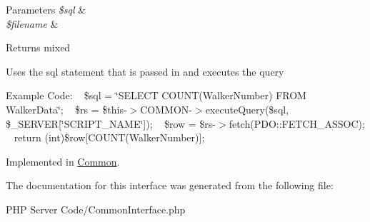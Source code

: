 \begin{DoxyParams}{Parameters}
{\em \$sql} & \\
\hline
{\em \$filename} & \\
\hline
\end{DoxyParams}
\begin{DoxyReturn}{Returns}
mixed
\end{DoxyReturn}
Uses the sql statement that is passed in and executes the query

Example Code\+: ~\newline
 \$sql = \char`\"{}\+S\+E\+L\+E\+C\+T C\+O\+U\+N\+T(\+Walker\+Number) F\+R\+O\+M Walker\+Data\char`\"{}; ~\newline
 \$rs = \$this-\/$>$C\+O\+M\+M\+O\+N-\/$>$execute\+Query(\$sql, \$\+\_\+\+S\+E\+R\+V\+ER\mbox{[}\char`\"{}\+S\+C\+R\+I\+P\+T\+\_\+\+N\+A\+M\+E\char`\"{}\mbox{]}); ~\newline
 \$row = \$rs-\/$>$fetch(\+P\+D\+O\+::\+F\+E\+T\+C\+H\+\_\+\+A\+S\+S\+O\+C); ~\newline
 return (int)\$row\mbox{[}\textquotesingle{}C\+O\+U\+N\+T(\+Walker\+Number)\textquotesingle{}\mbox{]}; ~\newline
 

Implemented in \hyperlink{class_common_a57a9dbd1203cf7b3ef3c5ce40d4047cc}{Common}.



The documentation for this interface was generated from the following file\+:\begin{DoxyCompactItemize}
\item 
P\+H\+P Server Code/Common\+Interface.\+php\end{DoxyCompactItemize}
